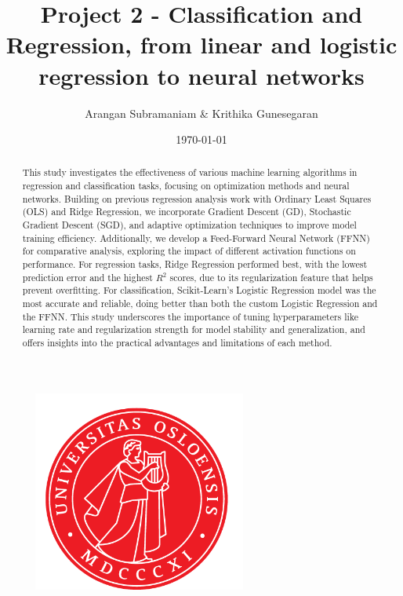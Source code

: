 \documentclass{article}
\newcommand{\0}{\mathbf{0}}
\newcommand{\1}{\mathbf{1}}
\begin{document}
\title{Project 2 - Classification and Regression, from linear and logistic regression to neural networks}
\author{Arangan Subramaniam \& Krithika Gunesegaran}
\date{\today}
\maketitle




\begin{figure}[h]
    \centering
    \includegraphics[width=7cm]{UiO-kopi.png}
    \label{fig:uio}
\end{figure}


\clearpage

\tableofcontents
\clearpage


\begin{abstract}


This study investigates the effectiveness of various machine learning algorithms in regression and classification tasks, focusing on optimization methods and neural networks. Building on previous regression analysis work with Ordinary Least Squares (OLS) and Ridge Regression, we incorporate Gradient Descent (GD), Stochastic Gradient Descent (SGD), and adaptive optimization techniques to improve model training efficiency. Additionally, we develop a Feed-Forward Neural Network (FFNN) for comparative analysis, exploring the impact of different activation functions on performance. For regression tasks, Ridge Regression performed best, with the lowest prediction error and the highest \( R^2 \) scores, due to its regularization feature that helps prevent overfitting. For classification, Scikit-Learn’s Logistic Regression model was the most accurate and reliable, doing better than both the custom Logistic Regression and the FFNN. This study underscores the importance of tuning hyperparameters like learning rate and regularization strength for model stability and generalization, and offers insights into the practical advantages and limitations of each method. 
\end{abstract}
\end{document}
